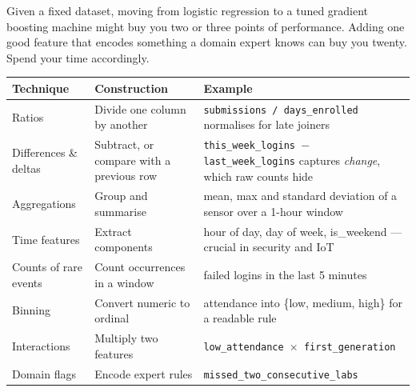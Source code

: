 \begin{conceptbox}
Given a fixed dataset, moving from logistic regression to a tuned gradient
boosting machine might buy you two or three points of performance. Adding one good
feature that encodes something a domain expert knows can buy you twenty. Spend your
time accordingly.
\end{conceptbox}

\begin{longtable}{@{}L{2.9cm}L{4.7cm}L{6.9cm}@{}}
\toprule
{}
\textbf{Technique} & \textbf{Construction} & \textbf{Example} \\
\midrule
\endhead
Ratios & Divide one column by another & \texttt{submissions / days\_enrolled} normalises for late joiners \\
Differences \& deltas & Subtract, or compare with a previous row & \texttt{this\_week\_logins $-$ last\_week\_logins} captures \emph{change}, which raw counts hide \\
Aggregations & Group and summarise & mean, max and standard deviation of a sensor over a 1-hour window \\
Time features & Extract components & hour of day, day of week, is\_weekend --- crucial in security and IoT \\
Counts of rare events & Count occurrences in a window & failed logins in the last 5 minutes \\
Binning & Convert numeric to ordinal & attendance into \{low, medium, high\} for a readable rule \\
Interactions & Multiply two features & \texttt{low\_attendance $\times$ first\_generation} \\
Domain flags & Encode expert rules & \texttt{missed\_two\_consecutive\_labs} \\
\bottomrule
\end{longtable}

